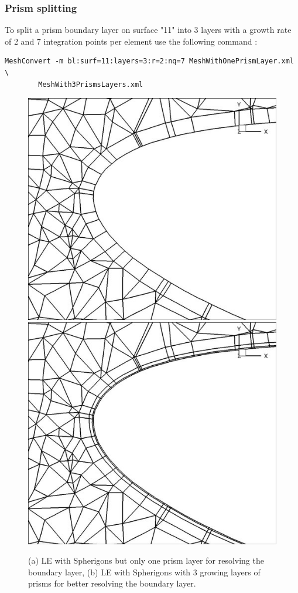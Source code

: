 \subsubsection{Prism splitting}
To split a prism boundary layer on surface "11" into 3 layers with a growth rate of 2 and 7 integration points per element use the following command :
\begin{lstlisting}[style=BashInputStyle]
MeshConvert -m bl:surf=11:layers=3:r=2:nq=7 MeshWithOnePrismLayer.xml \
        MeshWith3PrismsLayers.xml
\end{lstlisting}
\begin{figure}[!htbp]
\begin{center}
\includegraphics[width = 0.47 \textwidth]{Figures/SphnoBL.jpg}
\includegraphics[width = 0.47 \textwidth]{Figures/SphBL.jpg}
\caption{(a) LE with Spherigons but only one prism layer for resolving the boundary layer, (b)  LE with Spherigons with 3 growing layers of prisms for better resolving the boundary layer.}
\label{fig:}
\end{center}
\end{figure}
